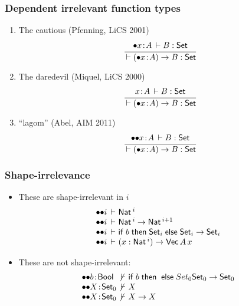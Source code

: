 \documentclass[t]{beamer}
\renewcommand{\Set}{\mathsf{Set}}
\newcommand{\cAnn}{\color{red!80!black}}%
\renewcommand{\emph}[1]{{\cAnn#1}}
\newcommand{\irr}{\mathord{\bullet}}
\newcommand{\shirr}{\mathord{{\bullet}{\bullet}}}
\renewcommand{\erhyp}[3][\irr]{#1#2 \of #3}
\newcommand{\shirrhyp}{\erhyp[\shirr]}
\renewcommand{\erfunT}[4][\irr]{(\erhyp[#1]{#2}{#3}) \to #4}
\begin{document}
\begin{frame}%
  \frametitle{Dependent irrelevant function types}
    \begin{enumerate}
    \item The cautious (Pfenning, LiCS 2001)
\[
  \ru{\erhyp x A \der B : \Set
    }{\der \erfunT x A B : \Set}
\]
    \item The daredevil (Miquel, LiCS 2000)
\[
  \ru{x \of A \der B : \Set
    }{\der \erfunT x A B : \Set}
\]
    \item ``lagom'' (Abel, AIM 2011)
\[
  \ru{\shirrhyp x A \der B : \Set
    }{\der \erfunT x A B : \Set}
\]
    \end{enumerate}
\end{frame}

\begin{frame}%
  \frametitle{Shape-irrelevance}
\vspace{-2ex}
  \begin{itemize}
  \item These are shape-irrelevant in $i$
\[
\begin{array}{@{\shirr i \der~}l}
  \Nat^i
\\
  \Nat^i \to \Nat^{i+1}
\\
  \tifthenelse b {\Set_i} {\Set_i \to \Set_i}
\\
  (x : \Nat^i) \to \mathsf{Vec}\,A\,x
\end{array}
\]
  \item These are \emph{not} shape-irrelevant:
\[
\begin{array}{@{\shirr}l@{~\not\der~}l}
  b \of \Bool  & \tifthenelse b \Set_0 {\Set_0 \to \Set_0}
\\
  X \of \Set_0 & X
\\
  X \of \Set_0 & X \to X
\\
\end{array}
\]
  \end{itemize}
\end{frame}
\end{document}
